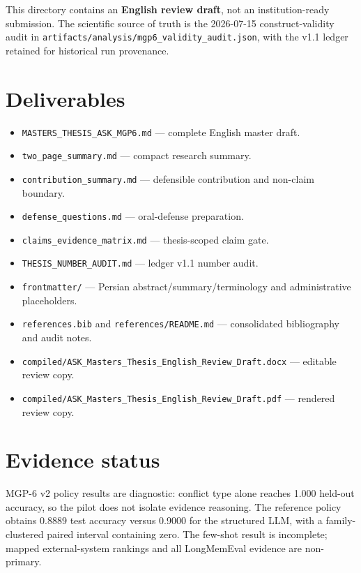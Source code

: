 This directory contains an \textbf{English review draft}, not an
institution-ready submission. The scientific source of truth is the
2026-07-15 construct-validity audit in
\texttt{artifacts/analysis/mgp6\_validity\_audit.json}, with the v1.1
ledger retained for historical run provenance.

\section{Deliverables}\label{deliverables}

\begin{itemize}
\tightlist
\item
  \texttt{MASTERS\_THESIS\_ASK\_MGP6.md} --- complete English master
  draft.
\item
  \texttt{two\_page\_summary.md} --- compact research summary.
\item
  \texttt{contribution\_summary.md} --- defensible contribution and
  non-claim boundary.
\item
  \texttt{defense\_questions.md} --- oral-defense preparation.
\item
  \texttt{claims\_evidence\_matrix.md} --- thesis-scoped claim gate.
\item
  \texttt{THESIS\_NUMBER\_AUDIT.md} --- ledger v1.1 number audit.
\item
  \texttt{frontmatter/} --- Persian abstract/summary/terminology and
  administrative placeholders.
\item
  \texttt{references.bib} and \texttt{references/README.md} ---
  consolidated bibliography and audit notes.
\item
  \texttt{compiled/ASK\_Masters\_Thesis\_English\_Review\_Draft.docx}
  --- editable review copy.
\item
  \texttt{compiled/ASK\_Masters\_Thesis\_English\_Review\_Draft.pdf} ---
  rendered review copy.
\end{itemize}

\section{Evidence status}\label{evidence-status}

MGP-6 v2 policy results are diagnostic: conflict type alone reaches
1.000 held-out accuracy, so the pilot does not isolate evidence
reasoning. The reference policy obtains 0.8889 test accuracy versus
0.9000 for the structured LLM, with a family-clustered paired interval
containing zero. The few-shot result is incomplete; mapped
external-system rankings and all LongMemEval evidence are non-primary.

